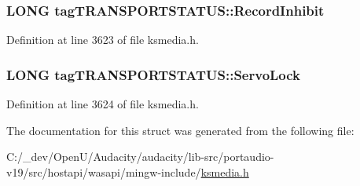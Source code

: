 \subsubsection[{\texorpdfstring{Record\+Inhibit}{RecordInhibit}}]{\setlength{\rightskip}{0pt plus 5cm}L\+O\+NG tag\+T\+R\+A\+N\+S\+P\+O\+R\+T\+S\+T\+A\+T\+U\+S\+::\+Record\+Inhibit}\hypertarget{structtag_t_r_a_n_s_p_o_r_t_s_t_a_t_u_s_a2dc5baa27f80e1e3732fb9d3f5c04620}{}\label{structtag_t_r_a_n_s_p_o_r_t_s_t_a_t_u_s_a2dc5baa27f80e1e3732fb9d3f5c04620}


Definition at line 3623 of file ksmedia.\+h.

\subsubsection[{\texorpdfstring{Servo\+Lock}{ServoLock}}]{\setlength{\rightskip}{0pt plus 5cm}L\+O\+NG tag\+T\+R\+A\+N\+S\+P\+O\+R\+T\+S\+T\+A\+T\+U\+S\+::\+Servo\+Lock}\hypertarget{structtag_t_r_a_n_s_p_o_r_t_s_t_a_t_u_s_a1ad9c0abb9b4e2f7c36df9ea4793885c}{}\label{structtag_t_r_a_n_s_p_o_r_t_s_t_a_t_u_s_a1ad9c0abb9b4e2f7c36df9ea4793885c}


Definition at line 3624 of file ksmedia.\+h.



The documentation for this struct was generated from the following file\+:\begin{DoxyCompactItemize}
\item 
C\+:/\+\_\+dev/\+Open\+U/\+Audacity/audacity/lib-\/src/portaudio-\/v19/src/hostapi/wasapi/mingw-\/include/\hyperlink{ksmedia_8h}{ksmedia.\+h}\end{DoxyCompactItemize}
